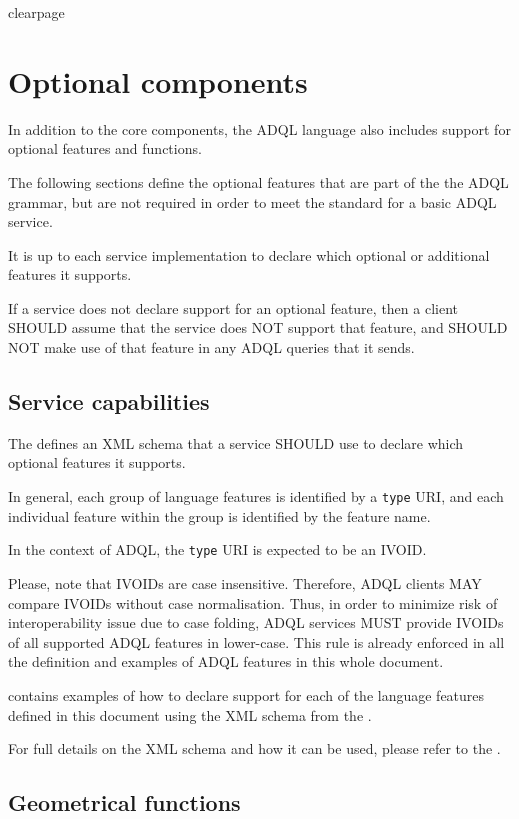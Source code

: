\documentclass[11pt,a4paper]{ivoa}
\begin{document}
clearpage %
\section{Optional components}
\label{sec:optional}

In addition to the core components, the ADQL language also includes support
for optional features and functions.

The following sections define the optional features that are part of the
the ADQL grammar, but are not required in order to meet the standard for
a basic ADQL service.

It is up to each service implementation to declare which optional or
additional features it supports.

If a service does not declare support for an optional feature,
then a client SHOULD assume that the service does NOT support
that feature, and SHOULD NOT make use of that feature in any
ADQL queries that it sends.

\subsection{Service capabilities}
\label{sec:capabilities}

The \TAPRegSpec{} defines an XML schema that a service SHOULD
use to declare which optional features it supports.

In general, each group of language features is identified by a \verb:type:
URI, and each individual feature within the group is identified by the
feature name.

In the context of ADQL, the \verb:type: URI is expected to be an IVOID.

Please, note that IVOIDs are case insensitive. Therefore, ADQL clients MAY
compare IVOIDs without case normalisation. Thus, in order to minimize risk of
interoperability issue due to case folding, ADQL services MUST provide IVOIDs of
all supported ADQL features in lower-case. This rule is already enforced
in all the definition and examples of ADQL features in this whole document.

 contains examples of how to declare support
for each of the language features defined in this document using the
XML schema from the \TAPRegSpec{}.

For full details on the XML schema and how it can be used, please refer to
the \TAPRegSpec{}.

\subsection{Geometrical functions}
\label{sec:functions.geom}
\end{document}
